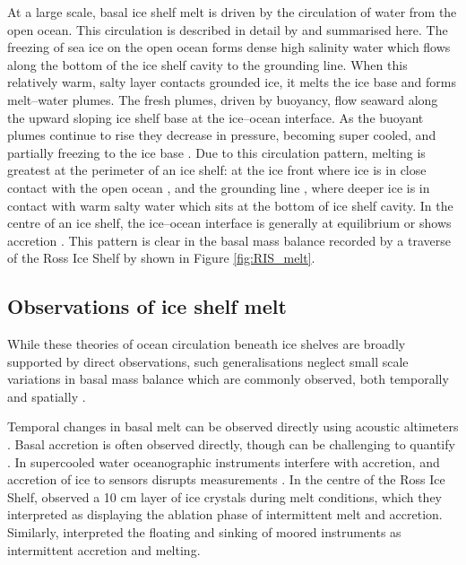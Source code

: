 At a large scale, basal  ice shelf melt is driven by the circulation of water from the open ocean. This circulation is described in detail by \cite{jacobs1992melting} and summarised here. The freezing of sea ice on the open ocean forms dense high salinity water which flows along the bottom of the  ice shelf cavity to the grounding line. When this relatively warm, salty layer contacts grounded ice, it melts the ice base and forms melt--water plumes. The fresh plumes, driven by buoyancy, flow seaward along the upward sloping  ice shelf base at the ice--ocean interface. As the buoyant plumes continue to rise they decrease in pressure, becoming super cooled, and partially freezing to the ice base \citep{lewis1986ice}.  
Due to this circulation pattern, melting is greatest at the perimeter of an  ice shelf: at the ice front where ice is in close contact with the open ocean \citep[e.g.][] {goldberg2019accurately}, and the grounding line \citep[e.g.][] {mankoff2012role}, where deeper ice is in contact with warm salty water which sits at the bottom of  ice shelf cavity. In the centre of an  ice shelf, the ice--ocean interface is generally at equilibrium or shows accretion \citep[e.g.][] {rignot2013ice}. This pattern is clear in the basal mass balance recorded by a traverse of the Ross Ice Shelf by \cite{snodgrass2021melting} shown in Figure \ref{fig:RIS_melt}.

\subsection{Observations of  ice shelf melt}
While these theories of ocean circulation beneath ice shelves are broadly supported by direct observations, such generalisations neglect small scale variations in basal mass balance which are commonly observed, both temporally \citep[e.g.][]{stewart2018ice} and spatially \citep[e.g.][]{marsh2016high}.


Temporal changes in basal melt can be observed directly using acoustic altimeters \citep[e.g.][]{stewart2018ice}. Basal accretion is often observed directly, though can be challenging to quantify \citep{vavnkova2020observations}. In supercooled water oceanographic instruments interfere with accretion, and accretion of ice to sensors disrupts measurements \citep{robinson2020ice}.   In the centre of the Ross Ice Shelf, \cite{stevens2020ocean} observed a 10 cm layer of ice crystals during melt conditions, which they interpreted as displaying the ablation phase of intermittent melt and accretion.  Similarly, \cite{craven2014platelet} interpreted the floating and sinking of moored instruments as intermittent accretion and melting.

